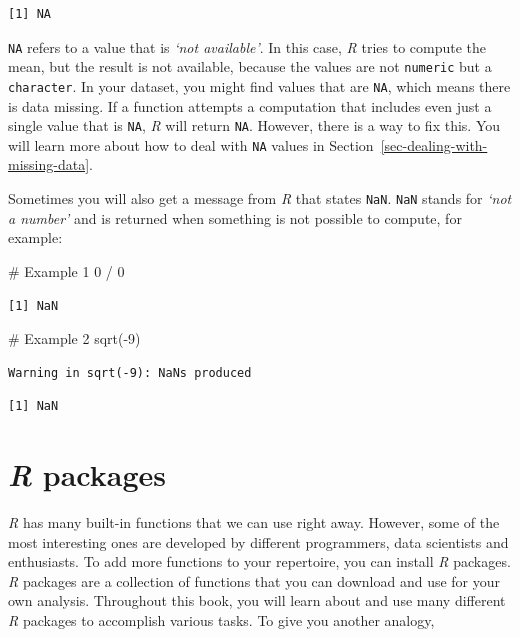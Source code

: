 \documentclass[
  letterpaper,
]{krantz}
\makeatletter
\newenvironment{Shaded}{\begin{snugshade}}{\end{snugshade}}
\newcommand{\CommentTok}[1]{\textcolor[rgb]{0.37,0.37,0.37}{#1}}
\newcommand{\DecValTok}[1]{\textcolor[rgb]{0.68,0.00,0.00}{#1}}
\newcommand{\FunctionTok}[1]{\textcolor[rgb]{0.28,0.35,0.67}{#1}}
\newcommand{\NormalTok}[1]{\textcolor[rgb]{0.00,0.23,0.31}{#1}}
\newcommand{\SpecialCharTok}[1]{\textcolor[rgb]{0.37,0.37,0.37}{#1}}
\newenvironment{kframe}{%
\medskip{}
\setlength{\fboxsep}{.8em}
 \def\at@end@of@kframe{}%
 \ifinner\ifhmode%
  \def\at@end@of@kframe{\end{minipage}}%
  \begin{minipage}{\columnwidth}%
 \fi\fi%
 \def\FrameCommand##1{\hskip\@totalleftmargin \hskip-\fboxsep
 \colorbox{shadecolor}{##1}\hskip-\fboxsep
     \hskip-\linewidth \hskip-\@totalleftmargin \hskip\columnwidth}%
 \MakeFramed {\advance\hsize-\width
   \@totalleftmargin\z@ \linewidth\hsize
   \@setminipage}}%
 {\par\unskip\endMakeFramed%
 \at@end@of@kframe}
\renewenvironment{Shaded}{\begin{kframe}}{\end{kframe}}
\makeatother
\begin{document}
\begin{verbatim}
[1] NA
\end{verbatim}

\texttt{NA} refers to a value that is \emph{`not available'}. In this
case, \emph{R} tries to compute the mean, but the result is not
available, because the values are not \texttt{numeric} but a
\texttt{character}. In your dataset, you might find values that are
\texttt{NA}, which means there is data missing. If a function attempts a
computation that includes even just a single value that is \texttt{NA},
\emph{R} will return \texttt{NA}. However, there is a way to fix this.
You will learn more about how to deal with \texttt{NA} values in
Section~\ref{sec-dealing-with-missing-data}.

Sometimes you will also get a message from \emph{R} that states
\texttt{NaN}. \texttt{NaN} stands for \emph{`not a number'} and is
returned when something is not possible to compute, for example:

\begin{Shaded}
\begin{Highlighting}[]
\CommentTok{\# Example 1}
\DecValTok{0} \SpecialCharTok{/} \DecValTok{0}
\end{Highlighting}
\end{Shaded}

\begin{verbatim}
[1] NaN
\end{verbatim}

\begin{Shaded}
\begin{Highlighting}[]
\CommentTok{\# Example 2}
\FunctionTok{sqrt}\NormalTok{(}\SpecialCharTok{{-}}\DecValTok{9}\NormalTok{)}
\end{Highlighting}
\end{Shaded}

\begin{verbatim}
Warning in sqrt(-9): NaNs produced
\end{verbatim}

\begin{verbatim}
[1] NaN
\end{verbatim}

\section{\texorpdfstring{\emph{R}
packages}{R packages}}\label{sec-r-packages}

\emph{R} has many built-in functions that we can use right away.
However, some of the most interesting ones are developed by different
programmers, data scientists and enthusiasts. To add more functions to
your repertoire, you can install \emph{R} packages. \emph{R} packages
are a collection of functions that you can download and use for your own
analysis. Throughout this book, you will learn about and use many
different \emph{R} packages to accomplish various tasks. To give you
another analogy,
\end{document}
